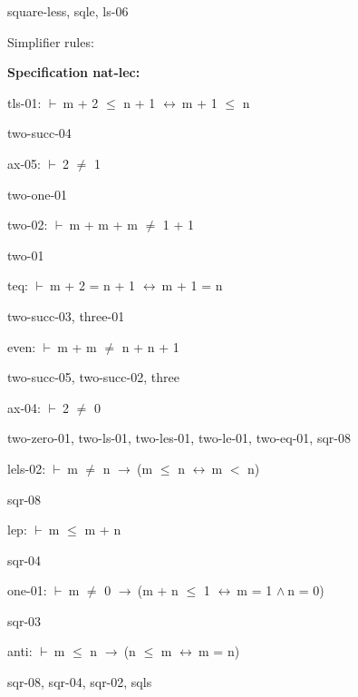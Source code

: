 \documentclass[a4paper]{article}
\newcommand{\Fol}{\mbox{$\vdash\ $}}
\newcommand{\And}{\mbox{$\wedge\ $}}
\newcommand{\Imp}{\mbox{$\rightarrow\ $}}
\newcommand{\Equiv}{\mbox{$\leftrightarrow\ $}}
\begin{document}
square-less, sqle, ls-06

\bigskip




Simplifier rules: 


{\bf Specification nat-lec:}

tls-01: 
 \Fol m + 2 $\le$ n + 1 \Equiv m + 1 $\le$ n



two-succ-04

\bigskip

ax-05: 
 \Fol 2 $\neq$ 1



two-one-01

\bigskip

two-02: 
 \Fol m + m + m $\neq$ 1 + 1



two-01

\bigskip

teq: 
 \Fol m + 2 = n + 1 \Equiv m + 1 = n



two-succ-03, three-01

\bigskip

even: 
 \Fol m + m $\neq$ n + n + 1



two-succ-05, two-succ-02, three

\bigskip

ax-04: 
 \Fol 2 $\neq$ 0



two-zero-01, two-ls-01, two-les-01, two-le-01, two-eq-01, sqr-08

\bigskip

lels-02: 
 \Fol m $\neq$ n \Imp (m $\le$ n \Equiv m $<$ n)



sqr-08

\bigskip

lep: 
 \Fol m $\le$ m + n



sqr-04

\bigskip

one-01: 
 \Fol m $\neq$ 0 \Imp (m + n $\le$ 1 \Equiv m = 1 \And n = 0)



sqr-03

\bigskip

anti: 
 \Fol m $\le$ n \Imp (n $\le$ m \Equiv m = n)



sqr-08, sqr-04, sqr-02, sqls
\end{document}
